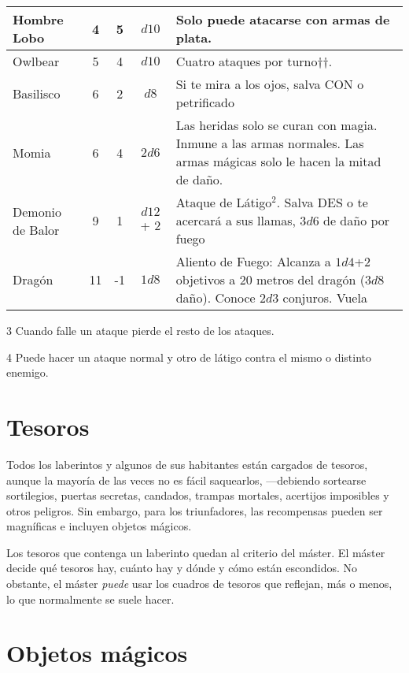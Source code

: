 \begin{multicols}{2}
\begin{table*}[p]
\begin{threeparttable}
\begin{tabular}{lcccp{8cm}}
Hombre Lobo & 4 & 5 &$  d10$ & Solo puede atacarse con armas de plata.\\
\midrule
Owlbear & 5 & 4 &$  d10$ & Cuatro ataques por turno††.\\
Basilisco & 6 & 2 &$  d8$ & Si te mira a los ojos, salva CON o petrificado\\
Momia & 6 & 4 & $ 2d6$ & Las heridas solo se curan con magia. Inmune a las armas normales. Las armas mágicas solo le hacen la mitad de daño.\\
Demonio de Balor & 9 & 1 &$  d12$ + 2 & Ataque de Látigo$^2$. Salva DES o te acercará a sus llamas, $ 3d6$ de daño por fuego\\
Dragón &11 & -1 & $ 1d8$ & Aliento de Fuego: Alcanza a $ 1d4$+2 objetivos a 20 metros
del dragón ($ 3d8$ daño). Conoce $ 2d3$ conjuros. Vuela\\
\bottomrule
\end{tabular}
\begin{tablenotes}
\item 3 Cuando falle un ataque pierde el resto de los ataques.
\item 4 Puede hacer un ataque normal y otro de látigo contra el mismo o distinto enemigo.
\end{tablenotes}
\end{threeparttable}
\end{table*}



\section{Tesoros}

Todos los laberintos y algunos de sus habitantes están cargados de tesoros, aunque
la mayoría de las veces no es fácil saquearlos, ---debiendo sortearse sortilegios,
puertas secretas, candados, trampas mortales, acertijos imposibles y otros peligros.
Sin embargo, para los triunfadores, las recompensas pueden ser magníficas e incluyen
objetos mágicos.

Los tesoros que contenga un laberinto quedan al criterio del máster. El máster decide
qué tesoros hay, cuánto hay y dónde y cómo están escondidos. No obstante, el máster
\emph{puede} usar los cuadros de tesoros que reflejan, más o menos, lo que normalmente se suele hacer.

\section{Objetos mágicos}


\end{multicols}
